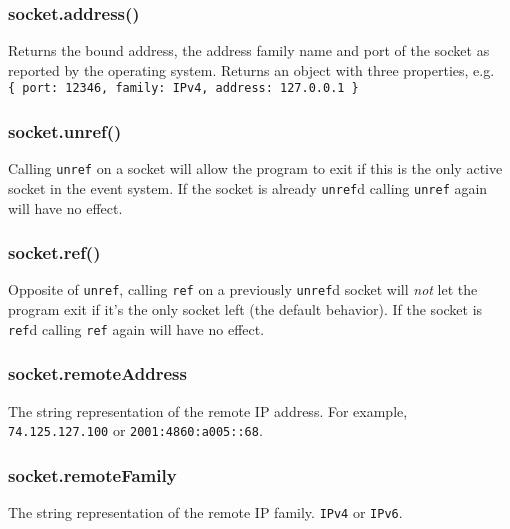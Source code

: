 \subsubsection{socket.address()}\label{socket.address}

Returns the bound address, the address family name and port of the
socket as reported by the operating system. Returns an object with three
properties, e.g.
\texttt{\{\ port:\ 12346,\ family:\ \textquotesingle{}IPv4\textquotesingle{},\ address:\ \textquotesingle{}127.0.0.1\textquotesingle{}\ \}}

\subsubsection{socket.unref()}\label{socket.unref}

Calling \texttt{unref} on a socket will allow the program to exit if
this is the only active socket in the event system. If the socket is
already \texttt{unref}d calling \texttt{unref} again will have no
effect.

\subsubsection{socket.ref()}\label{socket.ref}

Opposite of \texttt{unref}, calling \texttt{ref} on a previously
\texttt{unref}d socket will \emph{not} let the program exit if it's the
only socket left (the default behavior). If the socket is \texttt{ref}d
calling \texttt{ref} again will have no effect.

\subsubsection{socket.remoteAddress}\label{socket.remoteaddress}

The string representation of the remote IP address. For example,
\texttt{\textquotesingle{}74.125.127.100\textquotesingle{}} or
\texttt{\textquotesingle{}2001:4860:a005::68\textquotesingle{}}.

\subsubsection{socket.remoteFamily}\label{socket.remotefamily}

The string representation of the remote IP family.
\texttt{\textquotesingle{}IPv4\textquotesingle{}} or
\texttt{\textquotesingle{}IPv6\textquotesingle{}}.

